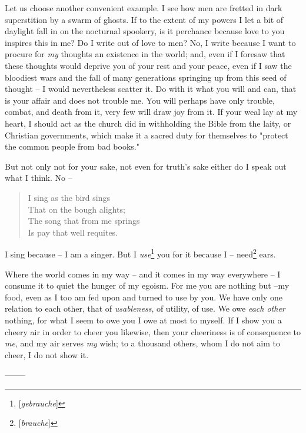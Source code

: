 \documentclass[a4paper]{book}
\begin{document}
Let us choose another convenient example. I see how men are fretted in dark 
superstition by a swarm of ghosts. If to the extent of my powers I let a bit 
of daylight fall in on the nocturnal spookery, is it perchance because love to 
you inspires this in me? Do I write out of love to men? No, I write because I 
want to procure for \textit{my} thoughts an existence in the world; and, even 
if I foresaw that these thoughts would deprive you of your rest and your 
peace, even if I saw the bloodiest wars and the fall of many generations 
springing up from this seed of thought -- I would nevertheless scatter it. Do 
with it what you will and can, that is your affair and does not trouble me. 
You will perhaps have only trouble, combat, and death from it, very few will 
draw joy from it. If your weal lay at my heart, I should act as the church did 
in withholding the Bible from the laity, or Christian governments, which make 
it a sacred duty for themselves to "{}protect the common people from bad 
books."{}

But not only not for your sake, not even for truth's sake either do I speak 
out what I think. No --

\begin{quotation}

\noindent{}I sing as the bird sings\\
 That on the bough alights;\\
 The song that from me springs\\
 Is pay that well requites.\end{quotation}

\noindent{}I sing because -- I am a singer. But I 
\textit{use}\footnote{[\textit{gebrauche}]} you for it because I -- 
need\footnote{[\textit{brauche}]} ears.

Where the world comes in my way -- and it comes in my way everywhere -- I 
consume it to quiet the hunger of my egoism. For me you are nothing but --my 
food, even as I too am fed upon and turned to use by you. We have only one 
relation to each other, that of \textit{usableness}, of utility, of use. We 
owe \textit{each other} nothing, for what I seem to owe you I owe at most to 
myself. If I show you a cheery air in order to cheer you likewise, then your 
cheeriness is of consequence to \textit{me}, and my air serves \textit{my} 
wish; to a thousand others, whom I do not aim to cheer, I do not show it.

\begin{center}
--------\end{center}
\end{document}
